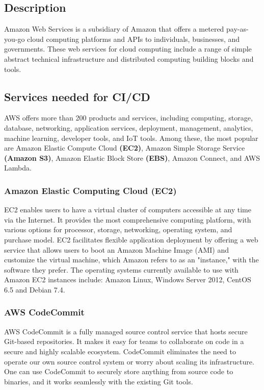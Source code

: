 \subsection{Description}
%
Amazon Web Services is a subsidiary of Amazon that offers a metered pay-as-you-go cloud computing platforms and APIs to individuals, businesses, and governments. These web services for cloud computing include a range of simple abstract technical infrastructure and distributed computing building blocks and tools. 
%
\subsection{Services needed for CI/CD}
%
AWS offers more than 200 products and services, including computing, storage, database, networking, application services, deployment, management, analytics, machine learning, developer tools, and IoT tools. Among these, the most popular are Amazon Elastic Compute Cloud \textbf{(EC2)}, Amazon Simple Storage Service \textbf{(Amazon S3)}, Amazon Elastic Block Store \textbf{(EBS)}, Amazon Connect, and AWS Lambda.

\subsubsection{Amazon Elastic Computing Cloud (EC2)}
%
EC2 enables users to have a virtual cluster of computers accessible at any time via the Internet. It provides the most comprehensive computing platform, with  various options for processor, storage, networking, operating system, and purchase model. EC2 facilitates flexible application deployment by offering a web service that allows users to boot an Amazon Machine Image (AMI) and customize the virtual machine, which Amazon refers to as an "instance," with the software they prefer. The operating systems currently available to use with Amazon EC2 instances include: Amazon Linux, Windows Server 2012, CentOS 6.5 and Debian 7.4.
%

\subsubsection{AWS CodeCommit}
%
AWS CodeCommit is a fully managed source control service that hosts secure Git-based repositories. It makes it easy for teams to collaborate on code in a secure and highly scalable ecosystem. CodeCommit eliminates the need to operate our own source control system or worry about scaling its infrastructure. One can use CodeCommit to securely store anything from source code to binaries, and it works seamlessly with the existing Git tools.  
%

